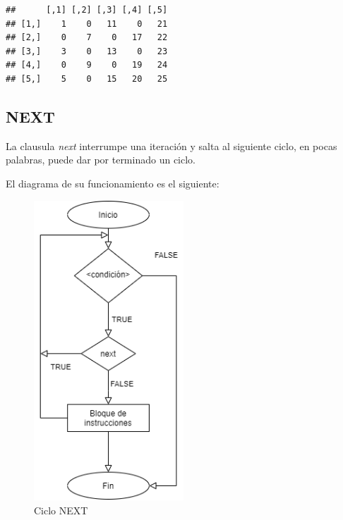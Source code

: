 \documentclass[11pt,]{article}
\newenvironment{Shaded}{\begin{snugshade}}{\end{snugshade}}
\newcommand{\CommentTok}[1]{\textcolor[rgb]{0.56,0.35,0.01}{\textit{#1}}}
\newcommand{\ControlFlowTok}[1]{\textcolor[rgb]{0.13,0.29,0.53}{\textbf{#1}}}
\newcommand{\DecValTok}[1]{\textcolor[rgb]{0.00,0.00,0.81}{#1}}
\newcommand{\KeywordTok}[1]{\textcolor[rgb]{0.13,0.29,0.53}{\textbf{#1}}}
\newcommand{\NormalTok}[1]{#1}
\newcommand{\OperatorTok}[1]{\textcolor[rgb]{0.81,0.36,0.00}{\textbf{#1}}}
\newcommand{\StringTok}[1]{\textcolor[rgb]{0.31,0.60,0.02}{#1}}
\begin{document}
\begin{Shaded}
\end{Shaded}

\begin{verbatim}
##      [,1] [,2] [,3] [,4] [,5]
## [1,]    1    0   11    0   21
## [2,]    0    7    0   17   22
## [3,]    3    0   13    0   23
## [4,]    0    9    0   19   24
## [5,]    5    0   15   20   25
\end{verbatim}

\hypertarget{next}{%
\subsection{NEXT}\label{next}}

La clausula \emph{next} interrumpe una iteración y salta al siguiente
ciclo, en pocas palabras, puede dar por terminado un ciclo.

El diagrama de su funcionamiento es el siguiente:

\begin{figure}
\hypertarget{id}{%
\centering
\includegraphics[width=0.5\textwidth,height=0.3\textheight]{../schemas/NEXT.png}
\caption{Ciclo NEXT}\label{id}
}
\end{figure}
\end{document}
